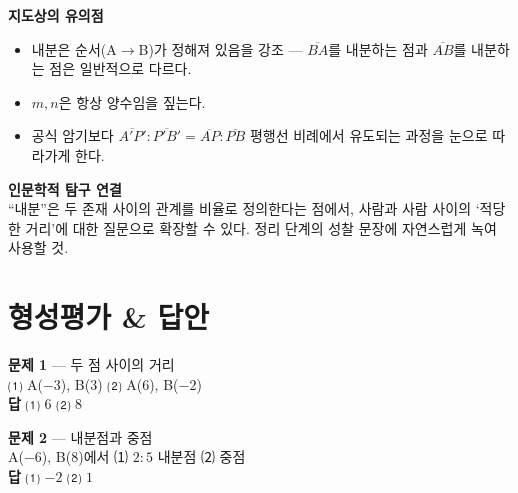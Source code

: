 \documentclass[11pt,a4paper]{article}
\begin{document}
\vspace{8pt}
\begin{minipage}[t]{0.48\linewidth}
\begin{calloutbox}
\textbf{지도상의 유의점}
\begin{itemize}[leftmargin=1.2em, itemsep=2pt, topsep=4pt]
  \item 내분은 순서(A$\to$B)가 정해져 있음을 강조 --- $\overline{BA}$를 내분하는 점과 $\overline{AB}$를 내분하는 점은 일반적으로 다르다.
  \item $m, n$은 항상 양수임을 짚는다.
  \item 공식 암기보다 $\overline{A'P'}:\overline{P'B'}=\overline{AP}:\overline{PB}$ 평행선 비례에서 유도되는 과정을 눈으로 따라가게 한다.
\end{itemize}
\end{calloutbox}
\end{minipage}\hfill
\begin{minipage}[t]{0.48\linewidth}
\begin{notebox}
\textbf{인문학적 탐구 연결}\\
``내분''은 두 존재 사이의 관계를 비율로 정의한다는 점에서, 사람과 사람 사이의 `적당한 거리'에 대한 질문으로 확장할 수 있다. 정리 단계의 성찰 문장에 자연스럽게 녹여 사용할 것.
\end{notebox}
\end{minipage}

\section{형성평가 \& 답안}

\begin{minipage}[t]{0.48\linewidth}
\begin{answerbox}
\textbf{문제 1} --- 두 점 사이의 거리\\
\small ⑴ A($-3$), B($3$) \quad ⑵ A($6$), B($-2$)\\[4pt]
\textbf{\color{goldstrong}답} \; ⑴ $6$ \quad ⑵ $8$
\end{answerbox}
\end{minipage}\hfill
\begin{minipage}[t]{0.48\linewidth}
\begin{answerbox}
\textbf{문제 2} --- 내분점과 중점\\
\small A($-6$), B($8$)에서 ⑴ $2{:}5$ 내분점 \quad ⑵ 중점\\[4pt]
\textbf{\color{goldstrong}답} \; ⑴ $-2$ \quad ⑵ $1$
\end{answerbox}
\end{minipage}
\end{document}
